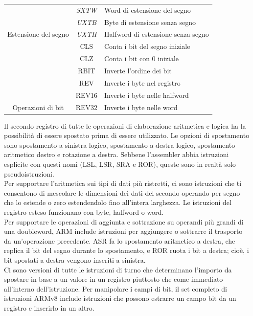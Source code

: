 \documentclass[12pt,a4paper]{article}
\begin{document}
\begin{longtable}{|c|c|l|}
                                                           & \textit{SXTW}         & Word di estensione del segno                       \\ \cline{2-3} 
                                                           & \textit{UXTB}         & Byte di estensione senza segno                     \\ \cline{2-3} 
\multirow{-5}{*}{Estensione del segno}                     & \textit{UXTH}         & Halfword di estensione senza segno                 \\ \hline
                                                           & CLS                   & Conta i bit del segno iniziale                     \\ \cline{2-3} 
                                                           & CLZ                   & Conta i bit con 0 iniziale                         \\ \cline{2-3} 
                                                           & RBIT                  & Inverte l'ordine dei bit                           \\ \cline{2-3} 
                                                           & REV                   & Inverte i byte nel registro                        \\ \cline{2-3} 
                                                           & REV16                 & Inverte i byte nelle halfword                      \\ \cline{2-3} 
\multirow{-6}{*}{Operazioni di bit}                        & REV32                 & Inverte i byte nelle word                          \\ \hline
\end{longtable}
Il secondo registro di tutte le operazioni di elaborazione aritmetica e logica ha la possibilità di essere spostato prima di essere utilizzato. Le opzioni di spostamento sono spostamento a sinistra logico, spostamento a destra logico, spostamento aritmetico destro e rotazione a destra. Sebbene l'assembler abbia istruzioni esplicite con questi nomi (LSL, LSR, SRA e ROR), queste sono in realtà solo pseudoistruzioni.\\
Per supportare l'aritmetica sui tipi di dati più ristretti, ci sono istruzioni che ti consentono di mescolare le dimensioni dei dati del secondo operando per segno che lo estende o zero estendendolo fino all'intera larghezza. Le istruzioni del registro esteso funzionano con byte, halfword o word.\\
Per supportare le operazioni di aggiunta e sottrazione su operandi più grandi di una doubleword, ARM include istruzioni per aggiungere o sottrarre il trasporto da un'operazione precedente. ASR fa lo spostamento aritmetico a destra, che replica il bit del segno durante lo spostamento, e ROR ruota i bit a destra; cioè, i bit spostati a destra vengono inseriti a sinistra.\\
Ci sono versioni di tutte le istruzioni di turno che determinano l'importo da spostare in base a un valore in un registro piuttosto che come immediato all'interno dell'istruzione. Per manipolare i campi di bit, il set completo di istruzioni ARMv8 include istruzioni che possono estrarre un campo bit da un registro e inserirlo in un altro.
\end{document}
